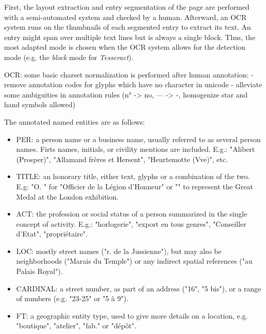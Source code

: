 First, the layout extraction and entry segmentation of the page are performed with a semi-automated system and
checked by a human. Afterward, an OCR system runs on the thumbnails of each segmented entry to extract its text. An
entry might span over multiple text lines but is always a single block. Thus, the most adapted mode is chosen when
the OCR system allows for the detection mode (e.g. the \emph{block} mode for \emph{Tesseract}). 

OCR: some basic charset normalization is performed after human annotation:
- remove annotation codes for glyphs which have no character in unicode
- alleviate some ambiguities in annotation rules (n° -> no, --- -> -, homogenize star and hand symbols allowed)


The annotated named entities are as follows:

\begin{itemize}
    \item PER: a person name or a business name, usually referred to as several person names. Firts names, initials, or civility mentions are included. E.g.: "Alibert (Prosper)", "Allamand frères et Hersent", "Heurtemotte (Vve)", etc.
    \item TITLE: an honorary title, either text, glyphs or a combination of the two. E.g: "O. " for "Officier de la Légion d'Honneur" or "" to represent the Great Medal at the London exhibition.
    \item ACT: the profession or social status of a person summarized in the single concept of activity. E.g.: "horlogerie", "export en tous genres", "Conseiller d'Etat", "propriétaire".
    \item LOC: mostly street names ("r. de la Jussienne"), but may also be neighborhoods ("Marais du Temple") or any indirect spatial references ("au Palais Royal").
    \item CARDINAL: a street number, as part of an address ("16", "5 bis"), or a range of numbers (e.g. "23-25" or "5 à 9").
    \item FT: a geographic entity type, used to give more details on a location, e.g. "boutique", "atelier", "fab." or "dépôt".
\end{itemize}


